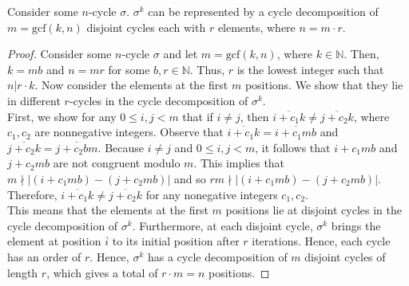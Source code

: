 \documentclass[12pt]{article}
\newcommand{\N}{\mathbb{N}}
\newenvironment{lemma}[2][Lemma]{\begin{trivlist} \item[\hskip \labelsep {\bfseries #1}\hskip \labelsep {\bfseries #2.}]}{\end{trivlist}}
\begin{document}
\begin{lemma}{A}
  Consider some $n$-cycle $\sigma$. $\sigma^{k}$ can be represented by a cycle decomposition of $m=\text{gcf}(k,n)$ disjoint cycles each with $r$ elements, where $n=m\cdot r$.
\begin{proof}
  Consider some $n$-cycle $\sigma$ and let $m=\text{gcf}(k,n)$, where $k\in \N$. Then, $k=mb$ and $n=mr$ for some $b,r\in\N$. Thus, $r$ is the lowest integer such that $n|r\cdot k$. Now consider the elements at the first $m$ positions. We show that they lie in different $r$-cycles in the cycle decomposition of $\sigma^{k}$. \\
  First, we show for any $0 \leq i,j < m$ that if $i\neq j$, then $\overline{i+c_{1}k} \neq \overline{j+c_{2}k}$, where $c_{1},c_{2}$ are nonnegative integers. Observe that $\overline{i+c_{1}k}=\overline{i+c_{1}mb}$ and $\overline{j+c_{2}k} = \overline{j+c_{2}bm}$. Because $i\neq j$ and $0\leq i,j<m$, it follows that $i+c_{1}mb$ and $j+c_{2}mb$ are not congruent modulo $m$. This implies that $m\nmid |(i+c_{1}mb)-(j+c_{2}mb)|$ and so $rm\nmid |(i+c_{1}mb)-(j+c_{2}mb)|$. Therefore, $\overline{i+c_{1}k}\neq \overline{j+c_{2}k}$ for any nonegative integers $c_{1},c_{2}$. \\
  This means that the elements at the first $m$ positions lie at disjoint cycles in the cycle decomposition of $\sigma^{k}$. Furthermore, at each disjoint cycle, $\sigma^{k}$ brings the element at position $\overline{i}$ to its initial position after $r$ iterations. Hence, each cycle has an order of $r$. Hence, $\sigma^{k}$ has a cycle decomposition of $m$ disjoint cycles of length $r$, which gives a total of $r\cdot m=n$ positions.  
\end{proof}
\end{lemma}

       
\end{document}
